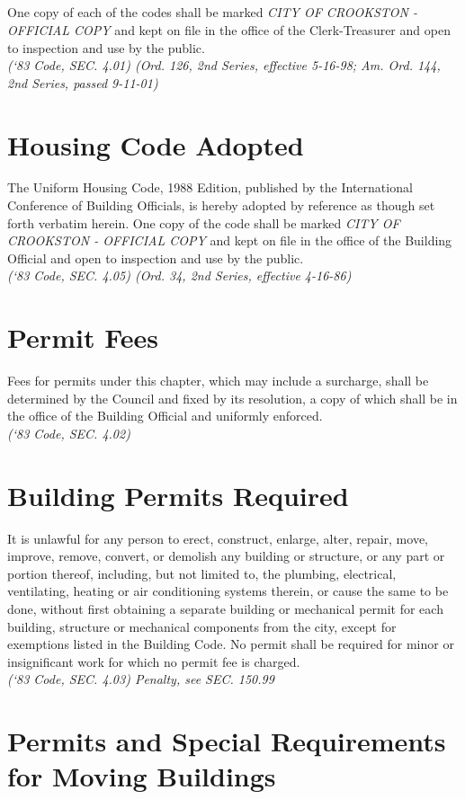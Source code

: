 \subsection{}
One copy of each of the codes shall be marked \emph{CITY OF CROOKSTON - OFFICIAL COPY} and kept on file in the office of the Clerk-Treasurer and open to inspection and use by the public.\\
\emph{(‘83 Code, SEC. 4.01)  (Ord. 126, 2nd Series, effective 5-16-98; Am. Ord. 144, 2nd Series, passed 9-11-01)}
\section{Housing Code Adopted}
The Uniform Housing Code, 1988 Edition, published by the International Conference of Building Officials, is hereby adopted by reference as though set forth verbatim herein.  One copy of the code shall be marked \emph{CITY OF CROOKSTON - OFFICIAL COPY} and kept on file in the office of the Building Official and open to inspection and use by the public.\\
\emph{(‘83 Code, SEC. 4.05)  (Ord. 34, 2nd Series, effective 4-16-86)}
\section{Permit Fees}
Fees for permits under this chapter, which may include a surcharge, shall be determined by the Council and fixed by its resolution, a copy of which shall be in the office of the Building Official and uniformly enforced.\\
\emph{(‘83 Code, SEC. 4.02)}
\section{Building Permits Required}
It is unlawful for any person to erect, construct, enlarge, alter, repair, move, improve, remove, convert, or demolish any building or structure, or any part or portion thereof, including, but not limited to, the plumbing, electrical, ventilating, heating or air conditioning systems therein, or cause the same to be done, without first obtaining a separate building or mechanical permit for each building, structure or mechanical components from the city, except for exemptions listed in the Building Code. No permit shall be required for minor or insignificant work for which no permit fee is charged.\\
\emph{(‘83 Code, SEC. 4.03)  Penalty, see SEC. 150.99}
\section{Permits and Special Requirements for Moving Buildings}
